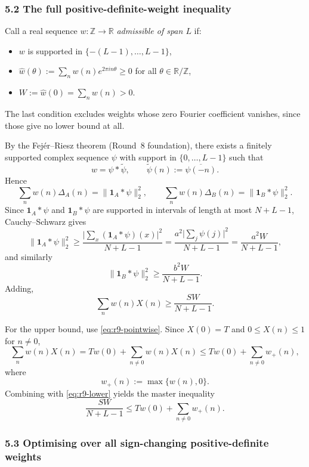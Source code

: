 \subsubsection{5.2 The full positive-definite-weight inequality}

Call a real sequence \(w:\mathbb Z\to\mathbb R\) \emph{admissible of span \(L\)} if:
\begin{itemize}
\item \(w\) is supported in \(\{-(L-1),\dots,L-1\}\),
\item \(\widehat w(\theta):=\sum_n w(n)e^{2\pi i n\theta}\ge 0\) for all \(\theta\in\mathbb R/\mathbb Z\),
\item \(W:=\widehat w(0)=\sum_n w(n)>0\).
\end{itemize}
The last condition excludes weights whose zero Fourier coefficient vanishes, since those give no lower bound at all.

By the Fej\'er--Riesz theorem (Round~8 foundation), there exists a finitely supported complex sequence \(\psi\) with support in \(\{0,\dots,L-1\}\) such that
\[
w=\psi*\widetilde\psi,
\qquad
\widetilde\psi(n):=\overline{\psi(-n)}.
\]
Hence
\[
\sum_n w(n)\Delta_A(n)=\|\mathbf 1_A*\psi\|_2^2,
\qquad
\sum_n w(n)\Delta_B(n)=\|\mathbf 1_B*\psi\|_2^2.
\]
Since \(\mathbf 1_A*\psi\) and \(\mathbf 1_B*\psi\) are supported in intervals of length at most \(N+L-1\), Cauchy--Schwarz gives
\[
\|\mathbf 1_A*\psi\|_2^2
\ge \frac{\bigl|\sum_x (\mathbf 1_A*\psi)(x)\bigr|^2}{N+L-1}
=\frac{a^2\bigl|\sum_j \psi(j)\bigr|^2}{N+L-1}
=\frac{a^2 W}{N+L-1},
\]
and similarly
\[
\|\mathbf 1_B*\psi\|_2^2\ge \frac{b^2 W}{N+L-1}.
\]
Adding,
\begin{equation}
\label{eq:r9-lower}
\sum_n w(n)X(n)
\ge \frac{SW}{N+L-1}.
\end{equation}

For the upper bound, use \eqref{eq:r9-pointwise}.  Since \(X(0)=T\) and \(0\le X(n)\le 1\) for \(n\ne 0\),
\[
\sum_n w(n)X(n)
=Tw(0)+\sum_{n\ne 0} w(n)X(n)
\le T w(0)+\sum_{n\ne 0} w_+(n),
\]
where
\[
w_+(n):=\max\{w(n),0\}.
\]
Combining with \eqref{eq:r9-lower} yields the master inequality
\begin{equation}
\label{eq:r9-master}
\frac{SW}{N+L-1}
\le T w(0)+\sum_{n\ne 0} w_+(n).
\end{equation}

\subsubsection{5.3 Optimising over all sign-changing positive-definite weights}

